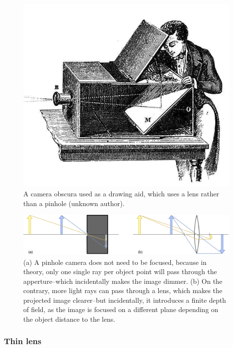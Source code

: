 \begin{figure}[hbtp]
	\centering
	\def\svgwidth{\columnwidth}
	\fontsize{10pt}{10pt}\selectfont
	\includegraphics[width=0.8\linewidth]{"../Chap2/Figures/Camera_Obscura.jpg"}
	\caption{A camera obscura used as a drawing aid, which uses a lens rather than a pinhole (unknown author). } 
	\label{fig_camobscura}
\end{figure}

\begin{figure}[hbtp]
	\centering
	\def\svgwidth{\columnwidth}
	\fontsize{10pt}{10pt}\selectfont
	\includegraphics[width=1\linewidth]{"../Chap2/Figures/Pinhole_Lens.png"}
	\caption{(a) A pinhole camera does not need to be focused, because in theory, only one single ray per object point will pass through the apperture--which incidentally makes the image dimmer. (b) On the contrary, more light rays can pass through a lens, which makes the projected image clearer--but incidentally, it introduces a finite depth of field, as the image is focused on a different plane depending on the object distance to the lens.} 
	\label{fig_pinholelens}
\end{figure}


\subsubsection{Thin lens}

